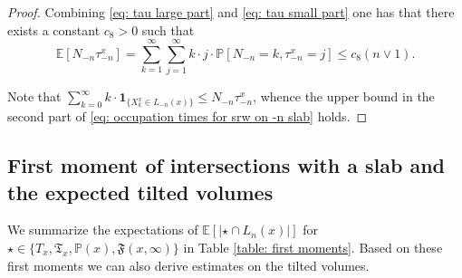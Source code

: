 \documentclass[12pt]{article}
\numberwithin{equation}{section}
\newcommand{\1}{\mathbf{1}}
\begin{document}
\begin{proof}
 Combining \eqref{eq: tau large part} and \eqref{eq: tau small part} one has that there exists a constant $c_8>0$ such that 
 \[
 \mathbb{E}[N_{-n}\tau_{-n}^x]=\sum_{k=1}^{\infty}\sum_{j=1}^{\infty}k\cdot j\cdot \mathbb{P}[N_{-n}=k,\tau_{-n}^x=j]\leq c_8(n\vee 1).
 \]
 	
 	Note that $\sum_{k=0}^{\infty}k\cdot\mathbf{1}_{\{X_k^x\in L_{-n}(x) \}}\leq N_{-n}\tau_{-n}^x$, whence the upper bound in the second part of    \eqref{eq: occupation times for srw on -n slab} holds. 
 \end{proof}
 




























 
 
 \subsection{First moment of intersections with a slab and the expected tilted volumes}
 
 We summarize the expectations of $\mathbb{E}[|\star \cap L_n(x)|]$ for $\star\in\{ T_x, \mathfrak{T}_x,\mathbb{P}(x),\mathfrak{F}(x,\infty) \}$ in Table \ref{table: first moments}.  Based on these first moments we can also derive estimates on the tilted volumes. 
 
 
\end{document}
